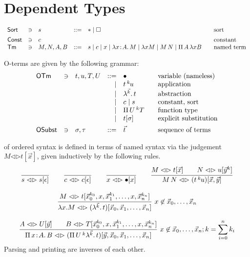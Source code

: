 \documentclass[a4paper]{article}
\newcommand{\OTm}{\mathsf{OTm}}
\newcommand{\OSubst}{\mathsf{OSubst}}
\newcommand{\oann}[1]{{}^{#1}\kern-0.15ex}
\newcommand{\ovar}{\mathord{\bullet}}
\newcommand{\oapp}[1]{\,\oann{#1}}
\newcommand{\olam}[1]{\lambda^{#1}.\,}
\newcommand{\opi}[2]{\Pi\,#1\,^{#2}}
\newcommand{\lrhd}{\mathrel{\mathord{\lhd}\mathord{\rhd}}}
\newcommand{\osyn}[3]{#1 \lrhd \esubst{#2}{#3}}
\newcommand{\osynp}[3]{\osyn{#1}{(#2)}{#3}}
\renewcommand{\esubst}[2]{#1[#2]}
\renewcommand{\funT}[2]{\Pi\,#1\of#2.\,}
\begin{document}
\section{Dependent Types}

\[
\begin{array}{lllrl@{\qquad}l}
\Sort & \ni & s & ::= & \ttype \mid \tkind & \mbox{sort} \\[1ex]
\Const & \ni & c &&& \mbox{constant} \\
\Tm    & \ni & M,N,A,B & ::= & s \mid c \mid x \mid \lam x A M 
  \mid \lambda x M \mid M \, N \mid \Pi\,A\,\lambda x B 
   & \mbox{named term}\\
\end{array}
\]


 O-terms are given by the following grammar:
\[
\begin{array}{lllrl@{\qquad}l}
\OTm & \ni & t,u,T,U & ::= & \ovar & \mbox{variable (nameless)} \\
&&& \mid & t \oapp k u & \mbox{application} \\
&&& \mid & \olam {\vec k} t & \mbox{abstraction} \\
&&& \mid & c \mid s & \mbox{constant, sort} \\
&&& \mid & \opi U k T & \mbox{function type} \\
&&& \mid & \esubst t \sigma & \mbox{explicit substitution} 
\\[1ex]
\OSubst & \ni & \sigma,\tau & ::= & \vec t & \mbox{sequence of terms}\\
\end{array}
\]

 of ordered syntax is defined in terms of named
syntax via the
judgement $\osyn M t {\vec x}$, given inductively by the following rules.
\begin{gather*}
  \ru{}{\osyn s s \epsilon}
\qquad
  \ru{}{\osyn c c \epsilon}
\qquad
  \ru{}{\osyn x \ovar x}
\qquad
  \ru{\osyn M t {\vec x} \qquad 
      \osyn N u {\vec y^k}
    }{\osynp {M\,N} {t \oapp k u} {\vec x, \vec y}}
\\[2ex]
  \rux{\osyn M t {\vec x_0^{k_0},x,\vec x_1^{k_1},\dots,x,\vec x_n^{k_n}}
     }{\osynp {\lambda x.M} {\olam {\vec k} t}
         {\vec x_0,\vec x_1,\dots,\vec x_n}
    }{x \not\in \vec x_0,\dots,\vec x_n}
\\[2ex]
  \rux{\osyn A U {\vec y} \qquad
       \osyn B T {\vec x_0^{k_0},x,\vec x_1^{k_1},\dots,x,\vec x_n^{k_n}}
     }{\osynp {\funT x A B} {\opi U k {\olam {\vec k} t}}
         {\vec y,\vec x_0,\vec x_1,\dots,\vec x_n}
     }{x \not\in \vec x_0,\dots,\vec x_n; 
       k = \sum_{i=0}^n k_i}
\end{gather*}
Parsing and printing are inverses of each other.
\end{document}
